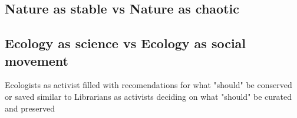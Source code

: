 \cite{holling_1998}
\cite{clements_1936}
\cite{gleason_1939}

\subsection{Nature as stable vs Nature as chaotic}

\cite{odum_1953} 
\cite{holling_1973}
\cite{barbour_1996}

\subsection{Ecology as science vs Ecology as social movement}

Ecologists as activist filled with recomendations for what "should" be conserved or saved similar to Librarians as activists deciding on what "should" be curated and preserved
